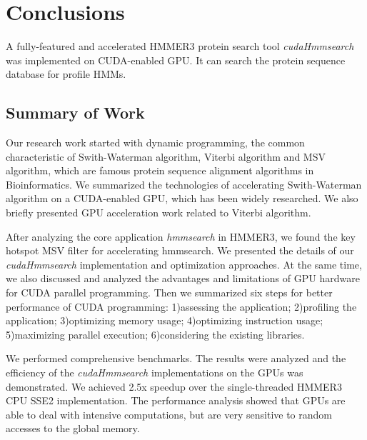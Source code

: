 

\chapter{Conclusions} %

\label{Conclusions} %


A fully-featured and accelerated HMMER3 protein search tool \emph{cudaHmmsearch} was implemented on CUDA-enabled GPU. It can search the protein sequence database for profile HMMs.


\section{Summary of Work}
Our research work started with dynamic programming, the common characteristic of Swith-Waterman algorithm, Viterbi algorithm and MSV algorithm, which are famous protein sequence alignment algorithms in Bioinformatics.
We summarized the technologies of accelerating Swith-Waterman algorithm on a CUDA-enabled GPU, which has been widely researched. We also briefly presented GPU acceleration work related to Viterbi algorithm.

After analyzing the core application \emph{hmmsearch} in HMMER3, we found the key hotspot MSV filter for accelerating hmmsearch. We presented the details of our \emph{cudaHmmsearch} implementation and optimization approaches. At the same time, we also discussed and analyzed the advantages and limitations of GPU hardware for CUDA parallel programming. Then we summarized six steps for better performance of CUDA programming: 1)assessing the application; 2)profiling the application; 3)optimizing memory usage; 4)optimizing instruction usage; 5)maximizing parallel execution; 6)considering the existing libraries.

We performed comprehensive benchmarks. The results were analyzed and the efficiency of the \emph{cudaHmmsearch} implementations on the GPUs was demonstrated. We achieved 2.5x speedup over the single-threaded HMMER3 CPU SSE2 implementation. The performance analysis showed that GPUs are able to deal with intensive computations, but are very sensitive to random accesses to the global memory.

